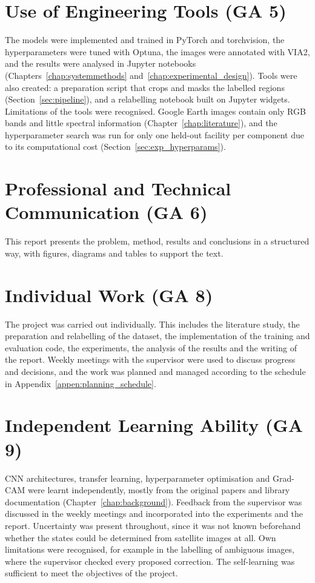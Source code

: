 \section{Use of Engineering Tools (GA 5)}
The models were implemented and trained in PyTorch and torchvision, the hyperparameters were tuned with Optuna, the images were annotated with VIA2, and the results were analysed in Jupyter notebooks (Chapters~\ref{chap:systemmethods} and~\ref{chap:experimental_design}). Tools were also created: a preparation script that crops and masks the labelled regions (Section~\ref{sec:pipeline}), and a relabelling notebook built on Jupyter widgets. Limitations of the tools were recognised. Google Earth images contain only RGB bands and little spectral information (Chapter~\ref{chap:literature}), and the hyperparameter search was run for only one held-out facility per component due to its computational cost (Section~\ref{sec:exp_hyperparams}).

\section{Professional and Technical Communication (GA 6)}
This report presents the problem, method, results and conclusions in a structured way, with figures, diagrams and tables to support the text.

\section{Individual Work (GA 8)}
The project was carried out individually. This includes the literature study, the preparation and relabelling of the dataset, the implementation of the training and evaluation code, the experiments, the analysis of the results and the writing of the report. Weekly meetings with the supervisor were used to discuss progress and decisions, and the work was planned and managed according to the schedule in Appendix~\ref{appen:planning_schedule}.

\section{Independent Learning Ability (GA 9)}
CNN architectures, transfer learning, hyperparameter optimisation and Grad-CAM were learnt independently, mostly from the original papers and library documentation (Chapter~\ref{chap:background}). Feedback from the supervisor was discussed in the weekly meetings and incorporated into the experiments and the report. Uncertainty was present throughout, since it was not known beforehand whether the states could be determined from satellite images at all. Own limitations were recognised, for example in the labelling of ambiguous images, where the supervisor checked every proposed correction. The self-learning was sufficient to meet the objectives of the project.

